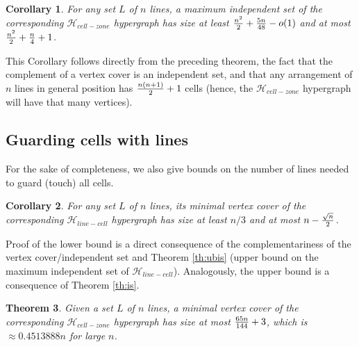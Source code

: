 \documentclass[11pt,a4paper]{article}
\newtheorem{theorem}{Theorem}
\newtheorem{corollary}[theorem]{Corollary}
\newcommand{\Hlinecell}{{\mathcal H}_{line-cell}}
\newcommand{\Hcellzone}{{\mathcal H}_{cell-zone}}
\begin{document}
\begin{corollary}\label{cor:CZIS}
For any set $L$ of $n$ lines, a maximum independent set of the corresponding $\Hcellzone$ hypergraph has size at least ${n^2 \over 2} + {5n \over 48} -o(1)$ and at most ${n^2 \over 2} + {n \over 4} +1$.
\end{corollary}
This Corollary follows directly from the preceding theorem, the fact that the complement of a vertex cover is an independent set, and that  
any arrangement of $n$ lines in general position has ${n(n+1)\over 2}+1$ cells (hence, the $\Hcellzone$ hypergraph will have that many vertices).


\subsection{Guarding cells with lines}
For the sake of completeness, we also give bounds on the number of lines needed to guard (touch) all cells.

\begin{corollary}\label{cor:CL}
For any set $L$ of $n$ lines, its minimal vertex cover of the corresponding $\Hlinecell$ hypergraph has size at least $n/3$ and at most $n-{\sqrt{n} \over 2}$.
\end{corollary}
Proof of the lower bound is a direct consequence of the complementariness of the vertex cover/independent set and Theorem \ref{th:ubis} (upper bound on the maximum independent set of $\Hlinecell$). Analogously, the upper bound is a consequence of Theorem \ref{th:is}.
\iffalse
\begin{theorem}\label{UB:guardwithcells}
Given a set $L$ of $n$ lines, a minimal vertex cover of the corresponding $\Hcellzone$ hypergraph has size at most ${65n \over 144} +3$, which is $\approx 0.4513888 n$ for large $n$.
\end{theorem}
\end{document}
